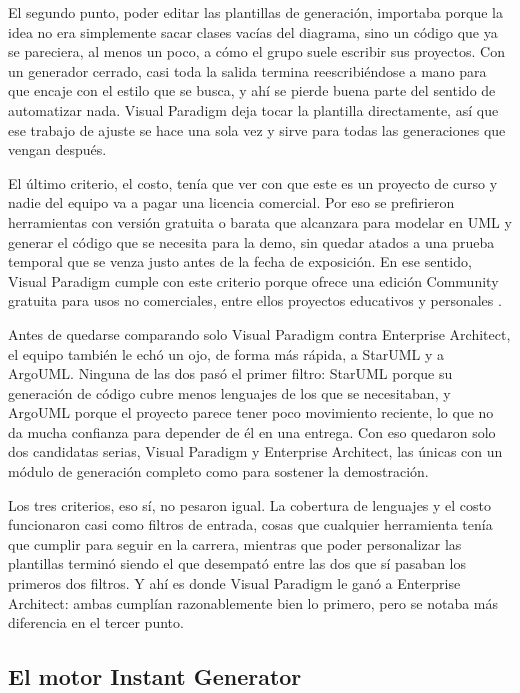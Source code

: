 \documentclass[journal,onecolumn]{IEEEtran}
\begin{document}
	El segundo punto, poder editar las plantillas de generación, importaba porque la idea no era simplemente sacar clases vacías del diagrama, sino un código que ya se pareciera, al menos un poco, a cómo el grupo suele escribir sus proyectos. Con un generador cerrado, casi toda la salida termina reescribiéndose a mano para que encaje con el estilo que se busca, y ahí se pierde buena parte del sentido de automatizar nada. Visual Paradigm deja tocar la plantilla directamente, así que ese trabajo de ajuste se hace una sola vez y sirve para todas las generaciones que vengan después.
	
	El último criterio, el costo, tenía que ver con que este es un proyecto de curso y nadie del equipo va a pagar una licencia comercial. Por eso se prefirieron herramientas con versión gratuita o barata que alcanzara para modelar en UML y generar el código que se necesita para la demo, sin quedar atados a una prueba temporal que se venza justo antes de la fecha de exposición. En ese sentido, Visual Paradigm cumple con este criterio porque ofrece una edición Community gratuita para usos no comerciales, entre ellos proyectos educativos y personales \cite{vp_community}.
	
	Antes de quedarse comparando solo Visual Paradigm contra Enterprise Architect, el equipo también le echó un ojo, de forma más rápida, a StarUML y a ArgoUML. Ninguna de las dos pasó el primer filtro: StarUML porque su generación de código cubre menos lenguajes de los que se necesitaban, y ArgoUML porque el proyecto parece tener poco movimiento reciente, lo que no da mucha confianza para depender de él en una entrega. Con eso quedaron solo dos candidatas serias, Visual Paradigm y Enterprise Architect, las únicas con un módulo de generación completo como para sostener la demostración.
	
	Los tres criterios, eso sí, no pesaron igual. La cobertura de lenguajes y el costo funcionaron casi como filtros de entrada, cosas que cualquier herramienta tenía que cumplir para seguir en la carrera, mientras que poder personalizar las plantillas terminó siendo el que desempató entre las dos que sí pasaban los primeros dos filtros. Y ahí es donde Visual Paradigm le ganó a Enterprise Architect: ambas cumplían razonablemente bien lo primero, pero se notaba más diferencia en el tercer punto.
	
	\subsection{El motor Instant Generator}
	
\end{document}
